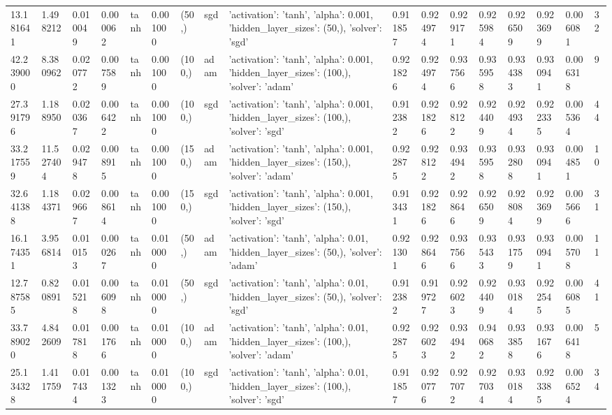 \documentclass[a1paper]{article}  %
\begin{document}
\begin{landscape}
\begin{tabular}{lllllllllllllllll}
		13.181641 & 1.498212 & 0.010049 & 0.000062 & tanh & 0.001000 & (50,) & sgd & {'activation': 'tanh', 'alpha': 0.001, 'hidden\_layer\_sizes': (50,), 'solver': 'sgd'} & 0.911857 & 0.924974 & 0.929171 & 0.925984 & 0.926509 & 0.923699 & 0.006081 & 32 \\
		42.239000 & 8.380962 & 0.020772 & 0.007589 & tanh & 0.001000 & (100,) & adam & {'activation': 'tanh', 'alpha': 0.001, 'hidden\_layer\_sizes': (100,), 'solver': 'adam'} & 0.921826 & 0.924974 & 0.937566 & 0.935958 & 0.934383 & 0.930941 & 0.006318 & 9 \\
		27.391796 & 1.188950 & 0.020367 & 0.006422 & tanh & 0.001000 & (100,) & sgd & {'activation': 'tanh', 'alpha': 0.001, 'hidden\_layer\_sizes': (100,), 'solver': 'sgd'} & 0.912382 & 0.921826 & 0.928122 & 0.924409 & 0.924934 & 0.922335 & 0.005364 & 44 \\
		33.217559 & 11.527404 & 0.029478 & 0.008915 & tanh & 0.001000 & (150,) & adam & {'activation': 'tanh', 'alpha': 0.001, 'hidden\_layer\_sizes': (150,), 'solver': 'adam'} & 0.922875 & 0.928122 & 0.934942 & 0.935958 & 0.932808 & 0.930941 & 0.004851 & 10 \\
		32.641388 & 1.184371 & 0.029667 & 0.008614 & tanh & 0.001000 & (150,) & sgd & {'activation': 'tanh', 'alpha': 0.001, 'hidden\_layer\_sizes': (150,), 'solver': 'sgd'} & 0.913431 & 0.921826 & 0.928646 & 0.926509 & 0.928084 & 0.923699 & 0.005666 & 31 \\
		16.174351 & 3.956814 & 0.010153 & 0.000267 & tanh & 0.010000 & (50,) & adam & {'activation': 'tanh', 'alpha': 0.01, 'hidden\_layer\_sizes': (50,), 'solver': 'adam'} & 0.921301 & 0.928646 & 0.937566 & 0.935433 & 0.931759 & 0.930941 & 0.005708 & 11 \\
		12.787585 & 0.820891 & 0.015218 & 0.006098 & tanh & 0.010000 & (50,) & sgd & {'activation': 'tanh', 'alpha': 0.01, 'hidden\_layer\_sizes': (50,), 'solver': 'sgd'} & 0.912382 & 0.919727 & 0.926023 & 0.924409 & 0.930184 & 0.922545 & 0.006085 & 41 \\
		33.789020 & 4.842609 & 0.017818 & 0.001766 & tanh & 0.010000 & (100,) & adam & {'activation': 'tanh', 'alpha': 0.01, 'hidden\_layer\_sizes': (100,), 'solver': 'adam'} & 0.922875 & 0.926023 & 0.934942 & 0.940682 & 0.933858 & 0.931676 & 0.006418 & 5 \\
		25.134328 & 1.411759 & 0.017434 & 0.001323 & tanh & 0.010000 & (100,) & sgd & {'activation': 'tanh', 'alpha': 0.01, 'hidden\_layer\_sizes': (100,), 'solver': 'sgd'} & 0.911857 & 0.920776 & 0.927072 & 0.927034 & 0.930184 & 0.923385 & 0.006524 & 34 \\

\end{tabular}
\end{landscape}
\end{document}
